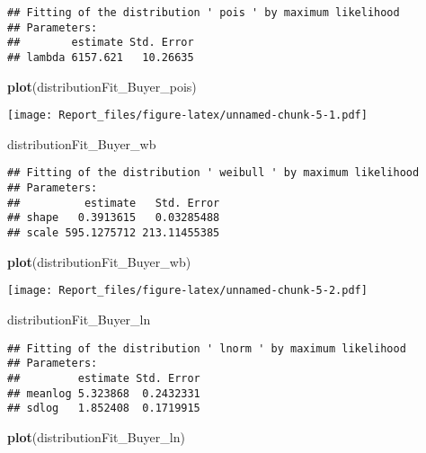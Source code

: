 \documentclass[]{article}
\newenvironment{Shaded}{\begin{snugshade}}{\end{snugshade}}
\newcommand{\KeywordTok}[1]{\textcolor[rgb]{0.13,0.29,0.53}{\textbf{#1}}}
\newcommand{\NormalTok}[1]{#1}
\begin{document}
\begin{verbatim}
## Fitting of the distribution ' pois ' by maximum likelihood 
## Parameters:
##        estimate Std. Error
## lambda 6157.621   10.26635
\end{verbatim}

\begin{Shaded}
\begin{Highlighting}[]
\KeywordTok{plot}\NormalTok{(distributionFit_Buyer_pois)}
\end{Highlighting}
\end{Shaded}

\texttt{[image: Report\_files/figure-latex/unnamed-chunk-5-1.pdf]}

\begin{Shaded}
\begin{Highlighting}[]
\NormalTok{distributionFit_Buyer_wb}
\end{Highlighting}
\end{Shaded}

\begin{verbatim}
## Fitting of the distribution ' weibull ' by maximum likelihood 
## Parameters:
##          estimate   Std. Error
## shape   0.3913615   0.03285488
## scale 595.1275712 213.11455385
\end{verbatim}

\begin{Shaded}
\begin{Highlighting}[]
\KeywordTok{plot}\NormalTok{(distributionFit_Buyer_wb)}
\end{Highlighting}
\end{Shaded}

\texttt{[image: Report\_files/figure-latex/unnamed-chunk-5-2.pdf]}

\begin{Shaded}
\begin{Highlighting}[]
\NormalTok{distributionFit_Buyer_ln}
\end{Highlighting}
\end{Shaded}

\begin{verbatim}
## Fitting of the distribution ' lnorm ' by maximum likelihood 
## Parameters:
##         estimate Std. Error
## meanlog 5.323868  0.2432331
## sdlog   1.852408  0.1719915
\end{verbatim}

\begin{Shaded}
\begin{Highlighting}[]
\KeywordTok{plot}\NormalTok{(distributionFit_Buyer_ln)}
\end{Highlighting}
\end{Shaded}
\end{document}
